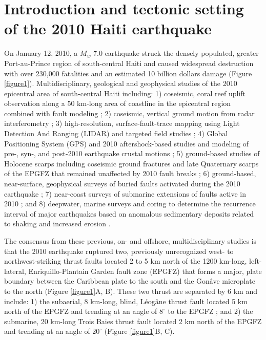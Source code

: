 \documentclass[linenumbers,draft]{agujournal}
\begin{document}
\section{Introduction and tectonic setting of the 2010 Haiti earthquake}
\label{sec:intro}
On January 12, 2010, a $M_w$ 7.0 earthquake struck the densely populated, greater Port-au-Prince region of south-central Haiti and caused widespread destruction with over 230,000 fatalities and an estimated 10 billion dollars damage \citep{prentice2010seismic,bilham2010lessons,paultre2013damage,kocel2016near} (Figure \ref{figure1}). Multidisciplinary, geological and geophysical studies of the 2010 epicentral area of south-central Haiti including: 1) coseismic, coral reef uplift observation along a 50 km-long area of coastline in the epicentral region combined with fault modeling \citep{hayes2010complex}; 2) coseismic, vertical ground motion from radar interferometry \citep{hashimoto2011fan}; 3) high-resolution, surface-fault-trace mapping using Light Detection And Ranging (LIDAR) and targeted field studies \citep{cowgill2012interactive}; 4) Global Positioning System (GPS) and 2010 aftershock-based studies and modeling of pre-, syn-, and post-2010 earthquake crustal motions \citep{calais2010transpressional,nettles2010earthquake,symithe2013coseismic,douilly2013crustal,douilly2015three}; 5) ground-based studies of Holocene scarps including coseismic ground fractures and late Quaternary scarps of the EPGFZ that remained unaffected by 2010 fault breaks \citep{prentice2010seismic,koehler2011field,rathje2014geotechnical,saint2015seismotectonics}; 6) ground-based, near-surface, geophysical surveys of buried faults activated during the 2010 earthquake \citep{kocel2016near}; 7) near-coast surveys of submarine extensions of faults active in 2010 \citep{hornbach2010high,mercier20112010}; and 8) deepwater, marine surveys and coring to determine the recurrence interval of major earthquakes based on anomalous sedimentary deposits related to shaking and increased erosion \citep{mchugh2011offshore}.

The consensus from these previous, on- and offshore, multidisciplinary studies is that the 2010 earthquake ruptured two, previously unrecognized west- to northwest-striking thrust faults located 2 to 5 km north of the 1200 km-long, left-lateral, Enriquillo-Plantain Garden fault zone (EPGFZ) that forms a major, plate boundary between the Caribbean plate to the south and the Gon\^ave microplate to the north \citep{mann1995actively,calais2010transpressional,benford2012gps,corbeau2016transpressive} (Figure \ref{figure1}A, B). These two thrust are separated by 6 km and include: 1) the subaerial, 8 km-long, blind, L\'eog\^ane thrust fault located 5 km north of the EPGFZ and trending at an angle of $8^{\circ}$ to the EPGFZ \citep{calais2010transpressional,douilly2013crustal,douilly2015three}; and 2) the submarine, 20 km-long Trois Baies thrust fault located 2 km north of the EPGFZ and trending at an angle of $20^{\circ}$ \citep{mercier20112010,symithe2013coseismic} (Figure \ref{figure1}B, C).
\end{document}
